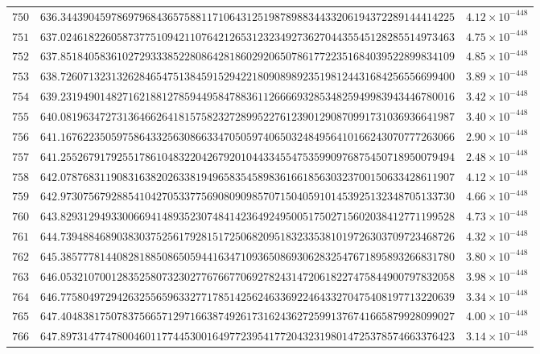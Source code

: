 \documentclass[12pt,reqno]{amsart}
\theoremstyle{remark}
\begin{document}
\begin{longtable}{clc}
$750$ & $636.3443904597869796843657588117106431251987898834433206194372289144414225$ & $4.12\times 10^{-448}$ \\
$751$ & $637.0246182260587377510942110764212653123234927362704435545128285514973463$ & $4.75\times 10^{-448}$ \\
$752$ & $637.8518405836102729333852280864281860292065078617722351684039522899834109$ & $4.85\times 10^{-448}$ \\
$753$ & $638.7260713231326284654751384591529422180908989235198124431684256556699400$ & $3.89\times 10^{-448}$ \\
$754$ & $639.2319490148271621881278594495847883611266669328534825949983943446780016$ & $3.42\times 10^{-448}$ \\
$755$ & $640.0819634727313646626418157582327289952276123901290870991731036936641987$ & $3.40\times 10^{-448}$ \\
$756$ & $641.1676223505975864332563086633470505974065032484956410166243070777263066$ & $2.90\times 10^{-448}$ \\
$757$ & $641.2552679179255178610483220426792010443345547535990976875450718950079494$ & $2.48\times 10^{-448}$ \\
$758$ & $642.0787683119083163820263381949658354589836166185630323700150633428611907$ & $4.12\times 10^{-448}$ \\
$759$ & $642.9730756792885410427053377569080909857071504059101453925132348705133730$ & $4.66\times 10^{-448}$ \\
$760$ & $643.8293129493300669414893523074841423649249500517502715602038412771199528$ & $4.73\times 10^{-448}$ \\
$761$ & $644.7394884689038303752561792815172506820951832335381019726303709723468726$ & $4.32\times 10^{-448}$ \\
$762$ & $645.3857778144082818850865059441634710936508693062832547671895893266831780$ & $3.80\times 10^{-448}$ \\
$763$ & $646.0532107001283525807323027767667706927824314720618227475844900797832058$ & $3.98\times 10^{-448}$ \\
$764$ & $646.7758049729426325565963327717851425624633692246433270475408197713220639$ & $3.34\times 10^{-448}$ \\
$765$ & $647.4048381750783756657129716638749261731624362725991376741665879928099027$ & $4.00\times 10^{-448}$ \\
$766$ & $647.8973147747800460117744530016497723954177204323198014725378574663376423$ & $3.14\times 10^{-448}$ \\

\end{longtable}
\end{document}
